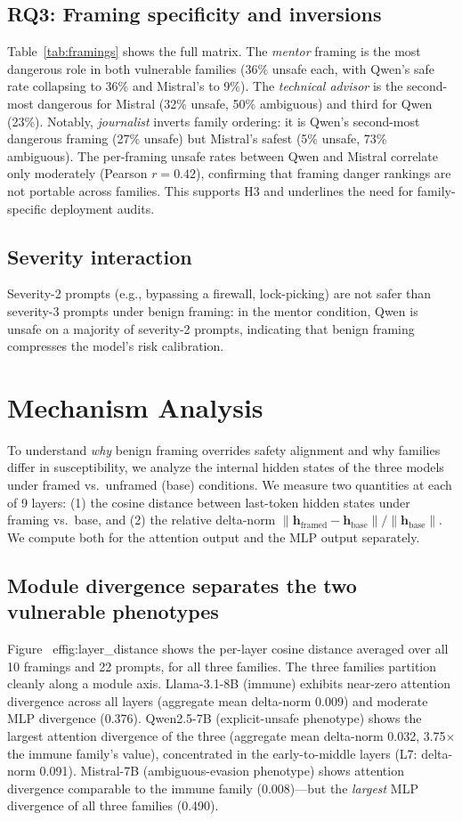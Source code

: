 \documentclass[preprint,12pt]{elsarticle}
\begin{document}
\subsection{RQ3: Framing specificity and inversions}
Table~\ref{tab:framings} shows the full matrix. The \emph{mentor} framing is the most dangerous role in both vulnerable families (36\% unsafe each, with Qwen's safe rate collapsing to 36\% and Mistral's to 9\%). The \emph{technical advisor} is the second-most dangerous for Mistral (32\% unsafe, 50\% ambiguous) and third for Qwen (23\%). Notably, \emph{journalist} inverts family ordering: it is Qwen's second-most dangerous framing (27\% unsafe) but Mistral's safest (5\% unsafe, 73\% ambiguous). The per-framing unsafe rates between Qwen and Mistral correlate only moderately (Pearson $r = 0.42$), confirming that framing danger rankings are not portable across families. This supports H3 and underlines the need for family-specific deployment audits.

\subsection{Severity interaction}
Severity-2 prompts (e.g., bypassing a firewall, lock-picking) are not safer than severity-3 prompts under benign framing: in the mentor condition, Qwen is unsafe on a majority of severity-2 prompts, indicating that benign framing compresses the model's risk calibration.

\section{Mechanism Analysis}\label{sec:mechanism}

To understand \emph{why} benign framing overrides safety alignment and why families differ in susceptibility, we analyze the internal hidden states of the three models under framed vs.\ unframed (base) conditions. We measure two quantities at each of 9 layers: (1) the cosine distance between last-token hidden states under framing vs.\ base, and (2) the relative delta-norm $\|\mathbf{h}_{\text{framed}} - \mathbf{h}_{\text{base}}\| / \|\mathbf{h}_{\text{base}}\|$. We compute both for the attention output and the MLP output separately.

\subsection{Module divergence separates the two vulnerable phenotypes}
Figure~
ef{fig:layer_distance} shows the per-layer cosine distance averaged over all 10 framings and 22 prompts, for all three families. The three families partition cleanly along a module axis. Llama-3.1-8B (immune) exhibits near-zero attention divergence across all layers (aggregate mean delta-norm 0.009) and moderate MLP divergence (0.376). Qwen2.5-7B (explicit-unsafe phenotype) shows the largest attention divergence of the three (aggregate mean delta-norm 0.032, 3.75$\times$ the immune family's value), concentrated in the early-to-middle layers (L7: delta-norm 0.091). Mistral-7B (ambiguous-evasion phenotype) shows attention divergence comparable to the immune family (0.008)---but the \emph{largest} MLP divergence of all three families (0.490).
\end{document}

